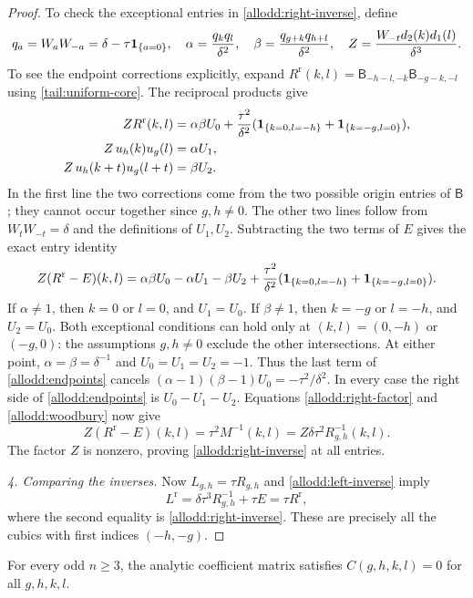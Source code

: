 \begin{proof}
To check the exceptional entries in
\eqref{allodd:right-inverse}, define
\[
 q_a=W_aW_{-a}=\delta-\tau\mathbf1_{\{a=0\}},\quad
 \alpha=\frac{q_kq_l}{\delta^2},\quad
 \beta=\frac{q_{g+k}q_{h+l}}{\delta^2},\quad
 Z=\frac{W_{-t}d_2(k)d_1(l)}{\delta^3}.
\]
To see the endpoint corrections explicitly, expand
$R^{\mathrm r}(k,l)=\mathsf B_{-h-l,-k}\mathsf B_{-g-k,-l}$
using \eqref{tail:uniform-core}. The reciprocal products give
\[
\begin{aligned}
 ZR^{\mathrm r}(k,l)
   &=\alpha\beta U_0+\frac{\tau^2}{\delta^2}
       (\mathbf1_{\{k=0,l=-h\}}+\mathbf1_{\{k=-g,l=0\}}),\\
 Z\,u_h(k)u_g(l)&=\alpha U_1,\\
 Z\,u_h(k+t)u_g(l+t)&=\beta U_2.
\end{aligned}
\]
In the first line the two corrections come from the two possible
origin entries of $\mathsf B$; they cannot occur together since
$g,h\ne0$. The other two lines follow from $W_tW_{-t}=\delta$
and the definitions of $U_1,U_2$.
Subtracting the two terms of $E$ gives the exact entry identity
\begin{equation}\label{allodd:endpoints}
 Z(R^{\mathrm r}-E)(k,l)
  =\alpha\beta U_0-\alpha U_1-\beta U_2
     +\frac{\tau^2}{\delta^2}
        (\mathbf1_{\{k=0,l=-h\}}+\mathbf1_{\{k=-g,l=0\}}).
\end{equation}
If $\alpha\ne1$, then $k=0$ or $l=0$, and $U_1=U_0$.
If $\beta\ne1$, then $k=-g$ or $l=-h$, and $U_2=U_0$.
Both exceptional conditions can hold only at $(k,l)=(0,-h)$
or $(-g,0)$: the assumptions $g,h\ne0$ exclude the other
intersections.  At either point,
$\alpha=\beta=\delta^{-1}$ and $U_0=U_1=U_2=-1$.
Thus the last term of \eqref{allodd:endpoints} cancels
$(\alpha-1)(\beta-1)U_0=-\tau^2/\delta^2$.
In every case the right side of \eqref{allodd:endpoints} is
$U_0-U_1-U_2$.  Equations \eqref{allodd:right-factor} and
\eqref{allodd:woodbury} now give
\[
 Z(R^{\mathrm r}-E)(k,l)
   =\tau^2M^{-1}(k,l)
   =Z\delta\tau^2R_{g,h}^{-1}(k,l).
\]
The factor $Z$ is nonzero, proving
\eqref{allodd:right-inverse} at all entries.

\emph{4. Comparing the inverses.} Now $L_{g,h}=\tau R_{g,h}$ and
\eqref{allodd:left-inverse} imply
\[
 L^{\mathrm r}=\delta\tau^3R_{g,h}^{-1}+\tau E
             =\tau R^{\mathrm r},
\]
where the second equality is \eqref{allodd:right-inverse}.
These are precisely all the cubics with first indices $(-h,-g)$.
\end{proof}

\begin{proposition}\label{allodd:all-cubics}
For every odd $n\ge3$, the analytic coefficient matrix satisfies
$C(g,h,k,l)=0$ for all $g,h,k,l$.
\end{proposition}


